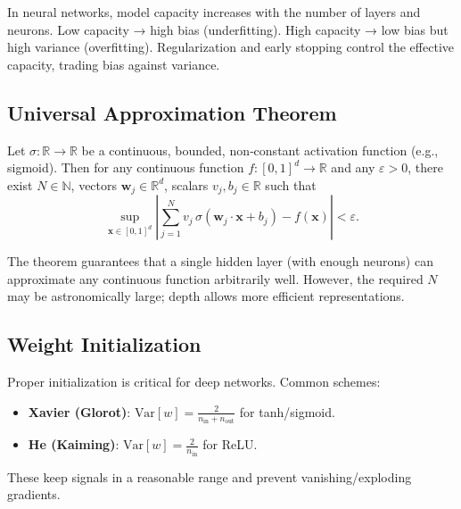 \documentclass{tufte-handout}
\begin{document}
In neural networks, model capacity increases with the number of layers and neurons. Low capacity → high bias (underfitting). High capacity → low bias but high variance (overfitting). Regularization and early stopping control the effective capacity, trading bias against variance.

\subsection{Universal Approximation Theorem}

\begin{thm}[Cybenko, 1989]
    Let $\sigma: \mathbb{R}\to\mathbb{R}$ be a continuous, bounded, non‑constant activation function (e.g., sigmoid). Then for any continuous function $f: [0,1]^d \to \mathbb{R}$ and any $\varepsilon>0$, there exist $N\in\mathbb{N}$, vectors $\mathbf{w}_j\in\mathbb{R}^d$, scalars $v_j, b_j\in\mathbb{R}$ such that
    \[
    \sup_{\mathbf{x}\in[0,1]^d} \left| \sum_{j=1}^N v_j\,\sigma(\mathbf{w}_j\cdot\mathbf{x} + b_j) - f(\mathbf{x}) \right| < \varepsilon.
    \]
\end{thm}

The theorem guarantees that a single hidden layer (with enough neurons) can approximate any continuous function arbitrarily well. However, the required $N$ may be astronomically large; depth allows more efficient representations.



\subsection{Weight Initialization}

Proper initialization is critical for deep networks. Common schemes:

\begin{itemize}
    \item \textbf{Xavier (Glorot)}: $\text{Var}[w] = \frac{2}{n_{\text{in}} + n_{\text{out}}}$ for tanh/sigmoid.
    \item \textbf{He (Kaiming)}: $\text{Var}[w] = \frac{2}{n_{\text{in}}}$ for ReLU.
\end{itemize}

These keep signals in a reasonable range and prevent vanishing/exploding gradients.
\end{document}
